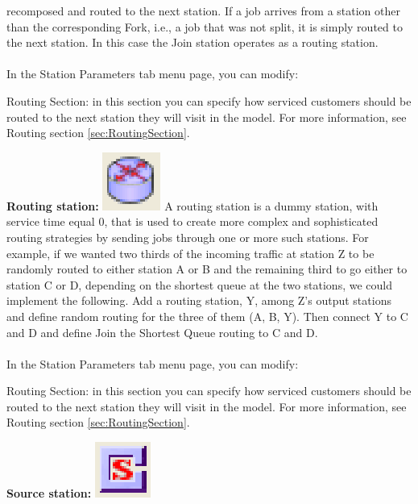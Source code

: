 \begin{enumerate*}
recomposed and routed to the next station. If a job arrives from a station other than the corresponding Fork, i.e., a job that was not split, it is simply routed to the next station. In this case the Join station operates as a routing station.\\\\
In the Station Parameters tab menu page, you can modify:
\begin{description*}
\item[Routing Section:] in this section you can specify how serviced customers should be routed to the next station they will visit in the model.
For more information, see Routing section \ref{sec:RoutingSection}.
\end{description*}
\item \textbf{Routing station:} \includegraphics[scale=1]{img/jsim/load_splitter.eps}
A routing station is a dummy station, with service time equal 0, that is used to create more complex and sophisticated routing strategies by sending jobs through one or more such stations. For example, if we wanted two thirds of the incoming traffic at station Z to be randomly routed to either station A or B and the remaining third to go either to station C or D, depending on the shortest queue at the two stations, we could implement the following. Add a routing station, Y, among Z's output stations and define random routing for the three of them (A, B, Y).
Then connect Y to C and D and define Join the Shortest Queue routing to C and D.\\\\
In the Station Parameters tab menu page, you can modify:
\begin{description*}
\item[Routing Section:] in this section you can specify how serviced customers should be routed to the next station they will visit in the model.
For more information, see Routing section \ref{sec:RoutingSection}.
\end{description*}
\item \textbf{Source station:} \includegraphics[scale=1]{img/jsim/source.eps}

\end{enumerate*}
